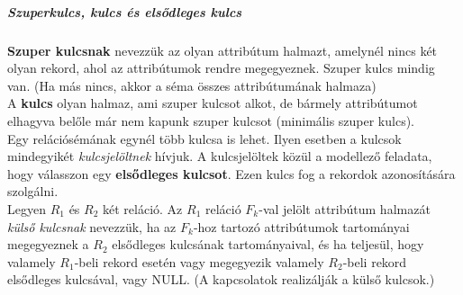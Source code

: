 \subparagraph{Szuperkulcs, kulcs és elsődleges kulcs} 
\textbf{Szuper kulcsnak} nevezzük az olyan attribútum halmazt, amelynél nincs két olyan rekord, ahol az attribútumok rendre megegyeznek. Szuper kulcs mindig van. (Ha más nincs, akkor a séma összes attribútumának halmaza)\\
A \textbf{kulcs} olyan halmaz, ami szuper kulcsot alkot, de bármely attribútumot elhagyva belőle már nem kapunk szuper kulcsot (minimális szuper kulcs).\\
Egy relációsémának egynél több kulcsa is lehet. Ilyen esetben a kulcsok mindegyikét \emph{kulcsjelöltnek} hívjuk. A kulcsjelöltek közül a modellező feladata, hogy válasszon egy \textbf{elsődleges kulcsot}. Ezen kulcs fog a rekordok azonosítására szolgálni.\\
Legyen $R_1$ és $R_2$ két reláció. Az $R_1$ reláció $F_k$-val jelölt attribútum halmazát \emph{külső kulcsnak} nevezzük, ha az $F_k$-hoz tartozó attribútumok tartományai megegyeznek a $R_2$ elsődleges kulcsának tartományaival, és ha teljesül, hogy valamely $R_1$-beli rekord esetén vagy megegyezik valamely $R_2$-beli rekord elsődleges kulcsával, vagy NULL. (A kapcsolatok realizálják a külső kulcsok.)

